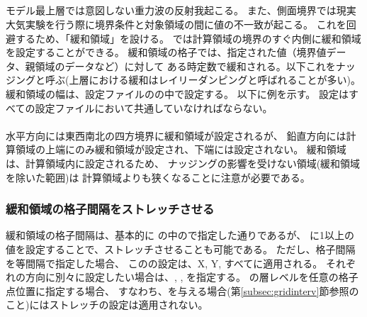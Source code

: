 \subsection{\SecBasicBufferSetting} \label{subsec:buffer}
モデル最上層では意図しない重力波の反射我起こる。
また、側面境界では現実大気実験を行う際に境界条件と対象領域の間に値の不一致が起こる。
これを回避するため、「緩和領域」を設ける。
\scalerm では計算領域の境界のすぐ内側に緩和領域を設定することができる。
緩和領域の格子では、指定された値（境界値データ、親領域のデータなど）に対して
ある時定数で緩和される。以下これをナッジングと呼ぶ(上層における緩和はレイリーダンピングと呼ばれることが多い)。
緩和領域の幅は、設定ファイルのの中で設定する。
以下に例を示す。
設定はすべての設定ファイルにおいて共通していなければならない。\\

\\

水平方向には東西南北の四方境界に緩和領域が設定されるが、
鉛直方向には計算領域の上端にのみ緩和領域が設定され、下端には設定されない。
%
緩和領域は、計算領域内に設定されるため、
ナッジングの影響を受けない領域(緩和領域を除いた範囲)は
計算領域よりも狭くなることに注意が必要である。

\subsubsection{緩和領域の格子間隔をストレッチさせる}

緩和領域の格子間隔は、基本的に 
の中ので指定した通りであるが、
に1以上の値を設定することで、ストレッチさせることも可能である。
ただし、格子間隔を等間隔で指定した場合、
このの設定は、X, Y, {\ZDIR}すべてに適用される。
それぞれの方向に別々に設定したい場合は、, , を指定する。
{\ZDIR}の層レベルを任意の格子点位置に指定する場合、
すなわち、を与える場合(第\ref{subsec:gridinterv}節参照のこと)にはストレッチの設定は適用されない。

